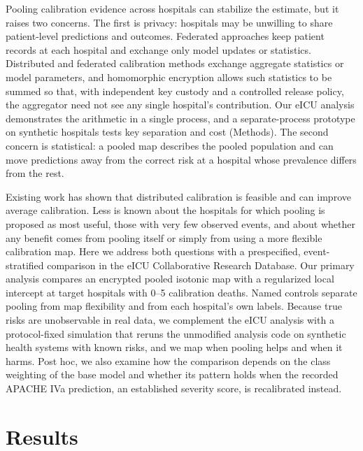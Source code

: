 \documentclass[11pt]{article}
\begin{document}
Pooling calibration evidence across hospitals can stabilize the estimate, but it raises two concerns. The first is privacy: hospitals may be unwilling to share patient-level predictions and outcomes. Federated approaches keep patient records at each hospital and exchange only model updates or statistics\cite{rieke2020}. Distributed and federated calibration methods exchange aggregate statistics or model parameters\cite{r4,r5,r16,r6,r20}, and homomorphic encryption allows such statistics to be summed so that, with independent key custody and a controlled release policy, the aggregator need not see any single hospital's contribution\cite{r18,r7,r8}. Our eICU analysis demonstrates the arithmetic in a single process, and a separate-process prototype on synthetic hospitals tests key separation and cost (Methods). The second concern is statistical: a pooled map describes the pooled population and can move predictions away from the correct risk at a hospital whose prevalence differs from the rest.

Existing work has shown that distributed calibration is feasible and can improve average calibration\cite{r4,r5,r6}. Less is known about the hospitals for which pooling is proposed as most useful, those with very few observed events, and about whether any benefit comes from pooling itself or simply from using a more flexible calibration map. Here we address both questions with a prespecified, event-stratified comparison in the eICU Collaborative Research Database\cite{r1,r2}. Our primary analysis compares an encrypted pooled isotonic map with a regularized local intercept at target hospitals with 0--5 calibration deaths. Named controls separate pooling from map flexibility and from each hospital's own labels. Because true risks are unobservable in real data, we complement the eICU analysis with a protocol-fixed simulation that reruns the unmodified analysis code on synthetic health systems with known risks, and we map when pooling helps and when it harms. Post hoc, we also examine how the comparison depends on the class weighting of the base model and whether its pattern holds when the recorded APACHE IVa prediction, an established severity score, is recalibrated instead.

\section*{Results}
\end{document}
